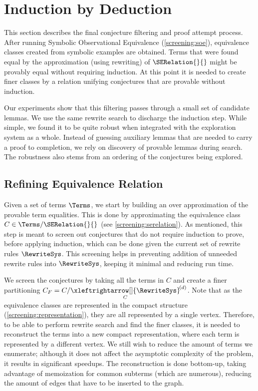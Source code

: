 \section{Induction by Deduction}
\label{thesy:induction}

This section describes the final conjecture filtering and proof attempt process.
After running Symbolic Observational Equivalence (\autoref{screening:soe}), equivalence classes created from symbolic examples are obtained.
Terms that were found equal by the approximation (using rewriting) of $\SERelation{}{}$ might be provably equal without requiring induction.
At this point it is needed to create finer classes by a relation unifying conjectures that are provable without induction.

Our experiments show that this filtering passes through a small set of candidate lemmas.
We use the same rewrite search to discharge the induction step.
While simple, we found it to be quite robust when integrated with the exploration system as a whole.
Instead of guessing auxiliary lemmas that are needed to carry a proof to
completion, we rely on discovery of provable lemmas during search.
The robustness also stems from an ordering of the conjectures being explored.

\subsection{Refining Equivalence Relation}

Given a set of terms $\Terms$, we start by building an over approximation of the provable term equalities. 
This is done by approximating the equivalence class $C \in \Terms / \SERelation{}{}$ (see \autoref{screening:serelation}).
As mentioned, this step is meant to screen out conjectures that do not require induction to prove, before applying induction, which can be done given the current set of rewrite rules $\RewriteSys$.
This screening helps in preventing addition of unneeded rewrite rules into $\RewriteSys$, keeping it minimal and reducing run time.

We screen the conjectures by taking all the terms in $C$ and create a finer partitioning $C_F = C / \underset{C}{\xleftrightarrow[]{\RewriteSys}}^{\!(d)}$.
Note that as the equivalence classes are represented in the compact structure (\autoref{screening:representation}), they are all represented by a single vertex.
Therefore, to be able to perform rewrite search and find the finer classes, it is needed to reconstruct the terms into a new compact representation, where each term is represented by a different vertex.
We still wish to reduce the amount of terms we enumerate; although it does not affect the asymptotic complexity of the problem, it results in significant speedups.
The reconstruction is done bottom-up, taking advantage of memoization for common subterms (which are numerous), reducing the amount of edges that have to be inserted to the graph.

